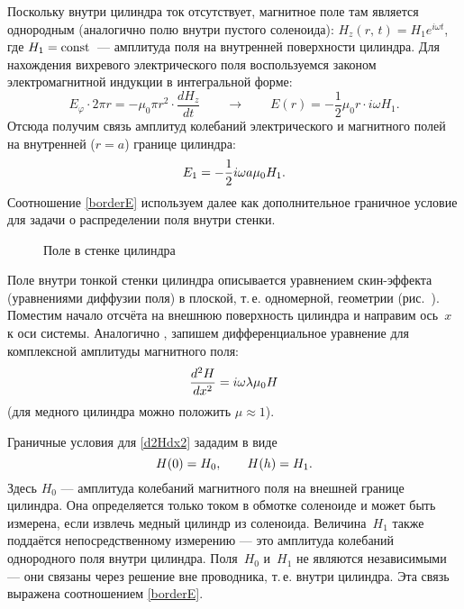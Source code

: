 Поскольку внутри цилиндра ток отсутствует, магнитное поле там является 
однородным (аналогично полю внутри пустого соленоида): 
$H_z(r,\,t)=H_1 e^{i\omega t}$, где $H_1=\mathrm{const}$~--- амплитуда поля на внутренней
поверхности цилиндра. Для нахождения вихревого электрического поля 
воспользуемся законом электромагнитной индукции  в интегральной
форме:
\[
E_{\varphi}\cdot 2\pi r = -\mu_0 \pi r^2 \cdot \frac{dH_z}{dt}\qquad
\to 
\qquad 
E(r) = -\frac12 \mu_0 r \cdot i\omega H_1.
\]
Отсюда получим связь амплитуд колебаний электрического и магнитного полей 
на внутренней ($r=a$) границе цилиндра:
\begin{equation}\eqmark{borderE}
E_1 = -\frac12  i\omega a\mu_0 H_1.
\end{equation}
Соотношение \eqref{borderE} используем далее как дополнительное граничное
условие для задачи о распределении поля внутри стенки.

\begin{wrapfigure}{o}{0.27\textwidth}
    \caption{Поле в стенке цилиндра}
\end{wrapfigure}
Поле внутри тонкой стенки цилиндра описывается уравнением скин-эффекта
 (уравнениями диффузии поля) в плоской, т.\,е. одномерной, геометрии 
(рис.~).
Поместим начало отсчёта на внешнюю поверхность цилиндра и направим ось~$x$ 
к оси системы.
Аналогично , 
запишем дифференциальное уравнение для комплексной амплитуды магнитного поля:
\begin{equation}\eqmark{d2Hdx2}
\frac{d^2H}{dx^2} = i\omega \lambda \mu_0 H
\end{equation}
(для медного цилиндра можно положить $\mu\approx 1$).

Граничные условия для \eqref{d2Hdx2} зададим в виде
\begin{equation}\eqmark{borderH}
H(0) = H_0,\qquad H(h) = H_1.
\end{equation}
Здесь $H_0$ --- амплитуда колебаний магнитного поля на внешней
границе цилиндра. Она определяется только током в обмотке соленоиде 
и может быть измерена, если извлечь медный цилиндр из соленоида.
Величина~$H_1$ также поддаётся непосредственному измерению --- это 
амплитуда колебаний однородного поля внутри цилиндра.
Поля~$H_0$ и~$H_1$ не являются независимыми --- они связаны через 
решение вне проводника, т.\,е. внутри цилиндра. Эта связь
выражена соотношением \eqref{borderE}.


